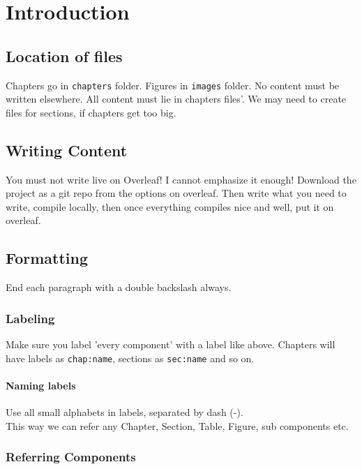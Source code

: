 \chapter{Introduction}
\label{chap:introduction}

\section{Location of files}
\label{sec:location-files}
Chapters go in \texttt{chapters} folder. Figures in \texttt{images} folder. No content must be written elsewhere. All content must lie in chapters files'. We may need to create files for sections, if chapters get too big.

\section{Writing Content}
\label{sec:content}
You must not write live on Overleaf! I cannot emphasize it enough! Download the project as a git repo from the options on overleaf. Then write what you need to write, compile locally, then once everything compiles nice and well, put it on overleaf.

\section{Formatting}
\label{sec:formatting}

End each paragraph with a double backslash always.\\

\subsection{Labeling}
\label{subsec:labeling}
Make sure you label 'every component' with a label like above. Chapters will have labels as \texttt{chap:name}, sections as \texttt{sec:name} and so on.

\subsubsection{Naming labels}
\label{subsubsec:naming-labels}
Use all small alphabets in labels, separated by dash (-).\\

This way we can refer any Chapter, Section, Table, Figure, sub components etc.

\subsection{Referring Components}
\label{subsec:referring-components}

